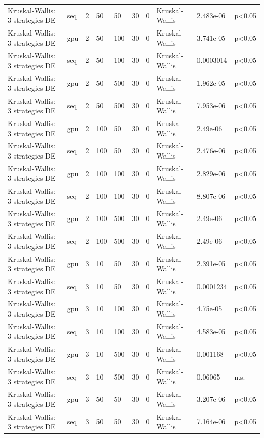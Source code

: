 \begin{table}[t]
\begin{tabular}{llllllllll}
Kruskal-Wallis: 3 strategies DE & seq & 2 & 50 & 50 & 30 & 0 & Kruskal-Wallis & 2.483e-06 & p<0.05 \\
Kruskal-Wallis: 3 strategies DE & gpu & 2 & 50 & 100 & 30 & 0 & Kruskal-Wallis & 3.741e-05 & p<0.05 \\
Kruskal-Wallis: 3 strategies DE & seq & 2 & 50 & 100 & 30 & 0 & Kruskal-Wallis & 0.0003014 & p<0.05 \\
Kruskal-Wallis: 3 strategies DE & gpu & 2 & 50 & 500 & 30 & 0 & Kruskal-Wallis & 1.962e-05 & p<0.05 \\
Kruskal-Wallis: 3 strategies DE & seq & 2 & 50 & 500 & 30 & 0 & Kruskal-Wallis & 7.953e-06 & p<0.05 \\
Kruskal-Wallis: 3 strategies DE & gpu & 2 & 100 & 50 & 30 & 0 & Kruskal-Wallis & 2.49e-06 & p<0.05 \\
Kruskal-Wallis: 3 strategies DE & seq & 2 & 100 & 50 & 30 & 0 & Kruskal-Wallis & 2.476e-06 & p<0.05 \\
Kruskal-Wallis: 3 strategies DE & gpu & 2 & 100 & 100 & 30 & 0 & Kruskal-Wallis & 2.829e-06 & p<0.05 \\
Kruskal-Wallis: 3 strategies DE & seq & 2 & 100 & 100 & 30 & 0 & Kruskal-Wallis & 8.807e-06 & p<0.05 \\
Kruskal-Wallis: 3 strategies DE & gpu & 2 & 100 & 500 & 30 & 0 & Kruskal-Wallis & 2.49e-06 & p<0.05 \\
Kruskal-Wallis: 3 strategies DE & seq & 2 & 100 & 500 & 30 & 0 & Kruskal-Wallis & 2.49e-06 & p<0.05 \\
Kruskal-Wallis: 3 strategies DE & gpu & 3 & 10 & 50 & 30 & 0 & Kruskal-Wallis & 2.391e-05 & p<0.05 \\
Kruskal-Wallis: 3 strategies DE & seq & 3 & 10 & 50 & 30 & 0 & Kruskal-Wallis & 0.0001234 & p<0.05 \\
Kruskal-Wallis: 3 strategies DE & gpu & 3 & 10 & 100 & 30 & 0 & Kruskal-Wallis & 4.75e-05 & p<0.05 \\
Kruskal-Wallis: 3 strategies DE & seq & 3 & 10 & 100 & 30 & 0 & Kruskal-Wallis & 4.583e-05 & p<0.05 \\
Kruskal-Wallis: 3 strategies DE & gpu & 3 & 10 & 500 & 30 & 0 & Kruskal-Wallis & 0.001168 & p<0.05 \\
Kruskal-Wallis: 3 strategies DE & seq & 3 & 10 & 500 & 30 & 0 & Kruskal-Wallis & 0.06065 & n.s. \\
Kruskal-Wallis: 3 strategies DE & gpu & 3 & 50 & 50 & 30 & 0 & Kruskal-Wallis & 3.207e-06 & p<0.05 \\
Kruskal-Wallis: 3 strategies DE & seq & 3 & 50 & 50 & 30 & 0 & Kruskal-Wallis & 7.164e-06 & p<0.05 \\

\end{tabular}
\end{table}
